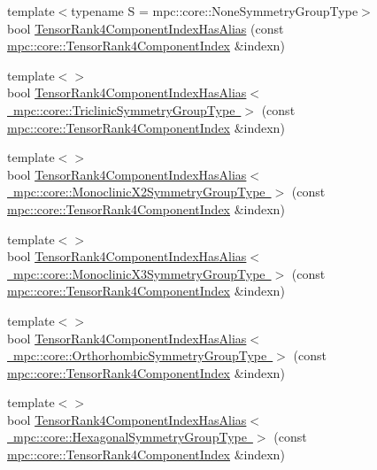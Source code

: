 \begin{DoxyCompactItemize}
\item 
{\footnotesize template$<$typename S  = mpc\+::core\+::\+None\+Symmetry\+Group\+Type$>$ }\\bool \mbox{\hyperlink{namespacempc_1_1core_a7242817d0014fa66d25e5cf10a2c4ddf}{Tensor\+Rank4\+Component\+Index\+Has\+Alias}} (const \mbox{\hyperlink{namespacempc_1_1core_a54c081f41b2475abd10182bf023805d2}{mpc\+::core\+::\+Tensor\+Rank4\+Component\+Index}} \&indexn)
\item 
{\footnotesize template$<$$>$ }\\bool \mbox{\hyperlink{namespacempc_1_1core_a20fb04000260d2acb9517d9004c26a06}{Tensor\+Rank4\+Component\+Index\+Has\+Alias$<$ mpc\+::core\+::\+Triclinic\+Symmetry\+Group\+Type $>$}} (const \mbox{\hyperlink{namespacempc_1_1core_a54c081f41b2475abd10182bf023805d2}{mpc\+::core\+::\+Tensor\+Rank4\+Component\+Index}} \&indexn)
\item 
{\footnotesize template$<$$>$ }\\bool \mbox{\hyperlink{namespacempc_1_1core_a19fdf1194e49ecd8a99003d78708ac2b}{Tensor\+Rank4\+Component\+Index\+Has\+Alias$<$ mpc\+::core\+::\+Monoclinic\+X2\+Symmetry\+Group\+Type $>$}} (const \mbox{\hyperlink{namespacempc_1_1core_a54c081f41b2475abd10182bf023805d2}{mpc\+::core\+::\+Tensor\+Rank4\+Component\+Index}} \&indexn)
\item 
{\footnotesize template$<$$>$ }\\bool \mbox{\hyperlink{namespacempc_1_1core_ac4ed81b1fb981df31670bb32592e4eb8}{Tensor\+Rank4\+Component\+Index\+Has\+Alias$<$ mpc\+::core\+::\+Monoclinic\+X3\+Symmetry\+Group\+Type $>$}} (const \mbox{\hyperlink{namespacempc_1_1core_a54c081f41b2475abd10182bf023805d2}{mpc\+::core\+::\+Tensor\+Rank4\+Component\+Index}} \&indexn)
\item 
{\footnotesize template$<$$>$ }\\bool \mbox{\hyperlink{namespacempc_1_1core_aed5c66342dec29f784602d5b3637fc6c}{Tensor\+Rank4\+Component\+Index\+Has\+Alias$<$ mpc\+::core\+::\+Orthorhombic\+Symmetry\+Group\+Type $>$}} (const \mbox{\hyperlink{namespacempc_1_1core_a54c081f41b2475abd10182bf023805d2}{mpc\+::core\+::\+Tensor\+Rank4\+Component\+Index}} \&indexn)
\item 
{\footnotesize template$<$$>$ }\\bool \mbox{\hyperlink{namespacempc_1_1core_a21f8cbab46bedb3a3588d926221a5fae}{Tensor\+Rank4\+Component\+Index\+Has\+Alias$<$ mpc\+::core\+::\+Hexagonal\+Symmetry\+Group\+Type $>$}} (const \mbox{\hyperlink{namespacempc_1_1core_a54c081f41b2475abd10182bf023805d2}{mpc\+::core\+::\+Tensor\+Rank4\+Component\+Index}} \&indexn)

\end{DoxyCompactItemize}
